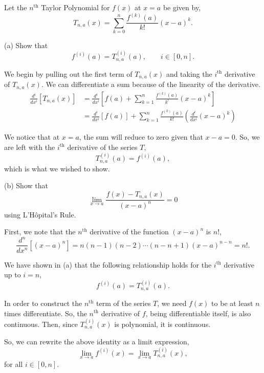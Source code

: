 \documentclass[../hw3]{subfiles}
\begin{document}
Let the $n^{\text{th}}$ Taylor Polynomial for $f(x)$ at $x=a$ be given by,
\[T_{n,a}(x)=\sum_{k=0}^{n}\frac{f^{(k)}(a)}{k!}{(x-a)}^k.\]

(a) Show that \[f^{(i)}(a)=T^{(i)}_{n,a}(a), \qquad i\in[0,n].\]


We begin by pulling out the first term of $T_{n,a}(x)$ and taking the $i^{\text{th}}$ derivative of $T_{n,a}(x)$. We can differentiate a sum because of the linearity of the derivative.
\begin{align*}
    \frac{d^i}{dx^i}[T_{n,a}(x)]&=\frac{d^i}{dx^i}\left[ f(a) + \sum_{k=1}^{n}\frac{f^{(k)}(a)}{k^!}{(x-a)}^k \right] \\
    &= \frac{d^i}{dx^i}[f(a)] +\sum_{k=1}^{n} \frac{f^{(k)}(a)}{k!}\left( \frac{d^i}{dx^i}{(x-a)}^k \right)
\end{align*}

We notice that at $x=a$, the sum will reduce to zero given that $x-a=0$. 
So, we are left with the $i^{\text{th}}$ derivative of the series $T$, \[T^{(i)}_{n,a}(a)=f^{(i)}(a),\] which is what we wished to show.


(b) Show that \[\lim\limits_{x\to a}\frac{f(x)-T_{n,a}(x)}{{(x-a)}^n}=0\] using L'Hôpital's Rule.

First, we note that the $n^{\text{th}}$ derivative of the function ${(x-a)}^n$ is $n!$,
\[\frac{d^n}{dx^n}\left[ {(x-a)}^n \right] = n(n-1)(n-2)\cdots(n-n+1){(x-a)}^{n-n}=n!.\]

We have shown in (a) that the following relationship holds for the $i^{\text{th}}$ derivative up to $i=n$,
\[f^{(i)}(a)=T^{(i)}_{n,a}(a).\]

In order to construct the $n^{\text{th}}$ term of the series $T$, we need $f(x)$ to be at least $n$ times differentiate. So, the $n^{\text{th}}$ derivative of $f$, being differentiable itself, is also continuous. Then, since $T^{(i)}_{n,a}(x)$ is polynomial, it is continuous.

So, we can rewrite the above identity as a limit expression,
\[\lim\limits_{x\to a} f^{(i)}(x)=\lim\limits_{x\to a}T^{(i)}_{n,a}(x),\] for all $i\in[0,n]$.
\end{document}
